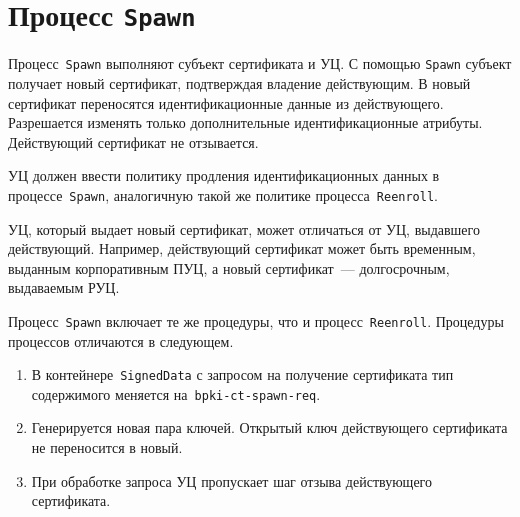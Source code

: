 \section{Процесс \texttt{Spawn}}\label{PROCESSES.Spawn}

Процесс~\texttt{Spawn} выполняют субъект сертификата и УЦ. 
С помощью \texttt{Spawn} субъект получает новый сертификат,
подтверждая владение действующим. В новый сертификат переносятся   
идентификационные данные из действующего. Разрешается изменять 
только дополнительные идентификационные атрибуты. Действующий 
сертификат не отзывается.

УЦ должен ввести политику продления идентификационных данных в 
процессе~\texttt{Spawn}, аналогичную такой же политике 
процесса~\texttt{Reenroll}.

УЦ, который выдает новый сертификат, может отличаться от УЦ, выдавшего 
действующий. Например, действующий сертификат может быть временным, 
выданным корпоративным ПУЦ, а новый сертификат~--- долгосрочным,
выдаваемым РУЦ.

Процесс~\texttt{Spawn} включает те же процедуры, что и
процесс~\texttt{Reenroll}. Процедуры процессов отличаются в следующем.

\begin{enumerate}
\item
В контейнере~\texttt{SignedData} с запросом на получение сертификата
тип содержимого меняется на~\texttt{bpki-ct-spawn-req}. 
\item
Генерируется новая пара ключей. Открытый ключ действующего сертификата
не переносится в новый.
\item
При обработке запроса УЦ пропускает шаг отзыва действующего сертификата. 
\end{enumerate}


